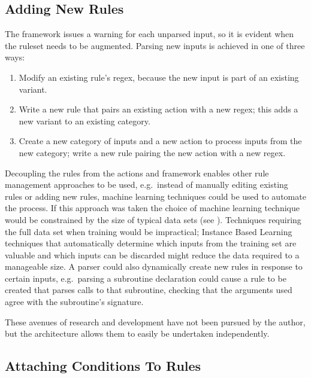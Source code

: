 \subsection{Adding New Rules}

The framework issues a warning for each unparsed input, so it is evident
when the ruleset needs to be augmented.  Parsing new inputs is achieved in
one of three ways:

\begin{enumerate}

    \item Modify an existing rule's regex, because the new input is part of
        an existing variant.

    \item Write a new rule that pairs an existing action with a new regex;
        this adds a new variant to an existing category.

    \item Create a new category of inputs and a new action to process
        inputs from the new category; write a new rule pairing the new
        action with a new regex.

\end{enumerate}

Decoupling the rules from the actions and framework enables other rule
management approaches to be used, e.g.\ instead of manually editing
existing rules or adding new rules, machine learning techniques could be
used to automate the process.  If this approach was taken the choice of
machine learning technique would be constrained by the size of typical data
sets (see ).  Techniques requiring the full
data set when training would be impractical; Instance Based
Learning~\cite{instance-based-learning} techniques that automatically
determine which inputs from the training set are valuable and which inputs
can be discarded might reduce the data required to a manageable size.  A
parser could also dynamically create new rules in response to certain
inputs, e.g.\ parsing a subroutine declaration could cause a rule to be
created that parses calls to that subroutine, checking that the arguments
used agree with the subroutine's signature.

These avenues of research and development have not been pursued by the
author, but the architecture allows them to easily be undertaken
independently.

\subsection{Attaching Conditions To Rules}

